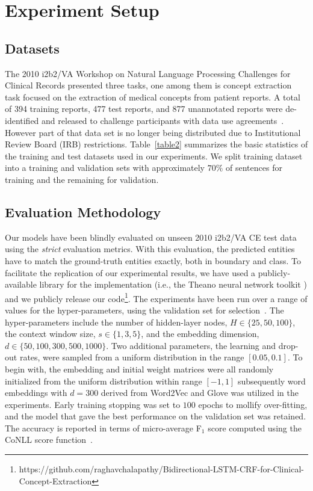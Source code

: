 \section{ Experiment Setup}
\label{Sec:experimentsetup}
\subsection{Datasets}
\label{sec:length}
The 2010 i2b2/VA Workshop on Natural Language Processing Challenges for Clinical Records presented three tasks, one among them is  concept extraction task focused on the extraction of medical concepts from patient  reports. A total of 394 training reports, 477 test reports, and 877 unannotated reports were de-identified and released to challenge participants with data use agreements~\cite{uzuner20112010}. However part of that data set is no longer being distributed due to Institutional Review Board (IRB) restrictions. Table~\ref{table2} summarizes the basic statistics of the training and test datasets used in our experiments. We split training dataset into a training and validation sets with approximately $70\%$ of sentences for training and the remaining for validation.

\subsection{Evaluation Methodology}
\label{sec:length}
Our models have been blindly evaluated on unseen 2010 i2b2/VA  CE test data using the \textit{strict} evaluation metrics. With this evaluation, the predicted entities have to match the ground-truth entities exactly, both in boundary and class. To facilitate the replication of our experimental results, we have used a publicly-available library for the implementation (i.e., the Theano neural network toolkit \cite{bergstra2010theano}) and we publicly release our code\footnote{\hspace{-0.65cm}https://github.com/raghavchalapathy/Bidirectional-LSTM-CRF-for-Clinical-Concept-Extraction}. The experiments have been run over a range of values for the hyper-parameters, using the validation set for selection~\cite{bergstra2012random}. The hyper-parameters include the number of hidden-layer nodes, $H \in \{25, 50, 100\}$, the context window size, $s \in \{1, 3, 5\}$, and the embedding dimension, $d \in \{50, 100, 300, 500, 1000\}$. Two additional parameters, the learning and drop-out rates, were sampled from a uniform distribution in the range $[0.05, 0.1]$. To begin with, the embedding and initial weight matrices were all randomly initialized from the uniform distribution within range $[-1, 1]$ subsequently word embeddings with $d= 300$ derived from Word2Vec and Glove was utilized in the experiments. Early training stopping was set to $100$ epochs to mollify over-fitting, and the model that gave the best performance on the validation set was retained. The accuracy is reported in terms of micro-average F$_1$ score computed using the CoNLL score function~\cite{Nadeau:07}.
